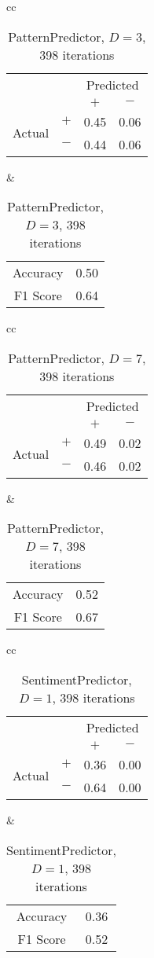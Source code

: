 \documentclass[twocolumn,10pt]{asme2ej}
\begin{document}
\begin{table}
  \begin{tabular}{cc}
    \begin{tabular}{cc|cc}
      & & \multicolumn{2}{c}{Predicted} \\
      & & $+ $ & $-$ \\
      \hline
      \multirow{2}{*}{Actual}
      & $+$ & 0.45 & 0.06 \\
      & $-$ & 0.44 & 0.06 \\
      \hline
    \end{tabular}
    &
    \begin{tabular}{cc}
      Accuracy & 0.50 \\
      F1 Score & 0.64 \\
    \end{tabular}
  \end{tabular}
  \caption{PatternPredictor, $D=3$, 398 iterations}
  \label{pred-perf-PatternPredictor-3-398}
\end{table}


\begin{table}
  \begin{tabular}{cc}
    \begin{tabular}{cc|cc}
      & & \multicolumn{2}{c}{Predicted} \\
      & & $+ $ & $-$ \\
      \hline
      \multirow{2}{*}{Actual}
      & $+$ & 0.49 & 0.02 \\
      & $-$ & 0.46 & 0.02 \\
      \hline
    \end{tabular}
    &
    \begin{tabular}{cc}
      Accuracy & 0.52 \\
      F1 Score & 0.67 \\
    \end{tabular}
  \end{tabular}
  \caption{PatternPredictor, $D=7$, 398 iterations}
  \label{pred-perf-PatternPredictor-7-398}
\end{table}


\begin{table}
  \begin{tabular}{cc}
    \begin{tabular}{cc|cc}
      & & \multicolumn{2}{c}{Predicted} \\
      & & $+ $ & $-$ \\
      \hline
      \multirow{2}{*}{Actual}
      & $+$ & 0.36 & 0.00 \\
      & $-$ & 0.64 & 0.00 \\
      \hline
    \end{tabular}
    &
    \begin{tabular}{cc}
      Accuracy & 0.36 \\
      F1 Score & 0.52 \\
    \end{tabular}
  \end{tabular}
  \caption{SentimentPredictor, $D=1$, 398 iterations}
  \label{pred-perf-SentimentPredictor-1-398}
\end{table}
\end{document}
